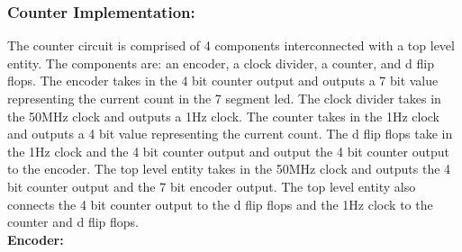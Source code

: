 \documentclass{article}
\begin{document}
\subsubsection*{Counter Implementation:}
The counter circuit is comprised of 4 components interconnected with a top level entity. The components are: an encoder, a clock divider, a counter, and d flip flops. The encoder takes in the 4 bit counter output and outputs a 7 bit value representing the current count in the 7 segment led. The clock divider takes in the 50MHz clock and outputs a 1Hz clock. The counter takes in the 1Hz clock and outputs a 4 bit value representing the current count. The d flip flops take in the 1Hz clock and the 4 bit counter output and output the 4 bit counter output to the encoder. The top level entity takes in the 50MHz clock and outputs the 4 bit counter output and the 7 bit encoder output. The top level entity also connects the 4 bit counter output to the d flip flops and the 1Hz clock to the counter and d flip flops. \\
\textbf{Encoder:}
\end{document}
